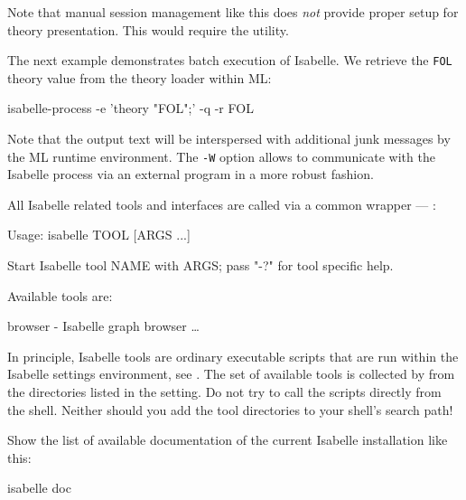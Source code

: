 \begin{isabellebody}
\begin{isamarkuptext}
  \medskip Note that manual session management like this does
  \emph{not} provide proper setup for theory presentation.  This would
  require the \hyperlink{tool.usedir}{\mbox{}} utility.

  \bigskip The next example demonstrates batch execution of Isabelle.
  We retrieve the \verb|FOL| theory value from the theory loader
  within ML:
\begin{ttbox}
isabelle-process -e 'theory "FOL";' -q -r FOL
\end{ttbox}
  Note that the output text will be interspersed with additional junk
  messages by the ML runtime environment.  The \verb|-W| option
  allows to communicate with the Isabelle process via an external
  program in a more robust fashion.%
\end{isamarkuptext}%
\isamarkuptrue%
%
\isamarkuptrue%
%
\begin{isamarkuptext}%
All Isabelle related tools and interfaces are called via a common
  wrapper --- \hyperlink{executable.isabelle}{\mbox{}}:

\begin{ttbox}
Usage: isabelle TOOL [ARGS ...]

  Start Isabelle tool NAME with ARGS; pass "-?" for tool specific help.

  Available tools are:

    browser - Isabelle graph browser
    \dots
\end{ttbox}

  In principle, Isabelle tools are ordinary executable scripts that
  are run within the Isabelle settings environment, see
  .  The set of available tools is collected by
  \hyperlink{executable.isabelle}{\mbox{}} from the directories listed in the \hyperlink{setting.ISABELLE-TOOLS}{\mbox{}} setting.  Do not try to call the scripts directly
  from the shell.  Neither should you add the tool directories to your
  shell's search path!%
\end{isamarkuptext}%
\isamarkuptrue%
%
\isamarkuptrue%
%
\begin{isamarkuptext}%
Show the list of available documentation of the current Isabelle
  installation like this:

\begin{ttbox}
  isabelle doc
\end{ttbox}


\end{isamarkuptext}
\end{isabellebody}
